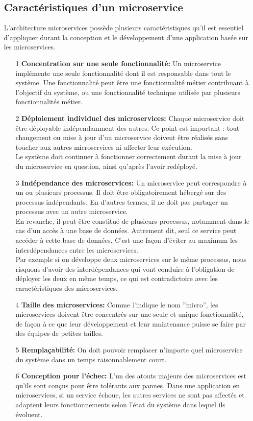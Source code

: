 \subsection{Caractéristiques d'un microservice}
L’architecture microservices possède plusieurs caractéristiques qu’il est essentiel d’appliquer durant la conception et le développement d’une application basée sur les microservices.
\begin{enumerate}
    \item[1] \textbf{Concentration sur une seule fonctionnalité:}  Un microservice implémente une seule fonctionnalité dont il est responsable dans tout le système. Une fonctionnalité peut être une fonctionnalité métier contribuant à l’objectif du système, ou une fonctionnalité technique utilisée par plusieurs fonctionnalités métier.
    \item[2] \textbf{Déploiement individuel des microservices:} Chaque microservice doit être déployable indépendamment des autres. Ce point est important : tout changement ou mise à jour d'un microservice doivent être réalisés sans toucher aux autres microservices ni affecter leur exécution.\\
    Le système doit continuer à fonctionner correctement durant la mise à jour du microservice en question, ainsi qu'après l’avoir redéployé.
    \item[3] \textbf{Indépendance des microservices:} Un microservice peut correspondre à un ou plusieurs processus. Il doit être obligatoirement hébergé sur des processus indépendants. En d’autres termes, il ne doit pas partager un processus avec un autre microservice.\\
    En revanche, il peut être constitué de plusieurs processus, notamment dans le cas d'un accès à une base de données. Autrement dit, seul ce service peut accéder à cette base de données. C’est une façon d’éviter au maximum les interdépendances entre les microservices.\\
    Par exemple si on développe deux microservices sur le même processus, nous risquons d’avoir des interdépendances qui vont conduire à l’obligation de déployer les deux en même temps, ce qui est contradictoire avec les caractéristiques des microservices.
    \item[4] \textbf{Taille des microservices:} Comme l’indique le nom ”micro”, les microservices doivent être concentrés sur une seule et unique fonctionnalité, de façon à ce que leur développement et leur maintenance puisse se faire par des équipes de petites tailles.
    \item[5] \textbf{Remplaçabilité:} On doit pouvoir remplacer n’importe quel microservice du système dans un temps raisonnablement court.
    \item[6] \textbf{Conception pour l’échec:} L’un des atouts majeurs des microservices est qu’ils sont conçus pour être tolérants aux pannes. Dans une application en microservices, si un service échoue, les autres services ne sont pas affectés et adaptent leurs fonctionnements selon l’état du système dans lequel ils évoluent.
\end{enumerate}
